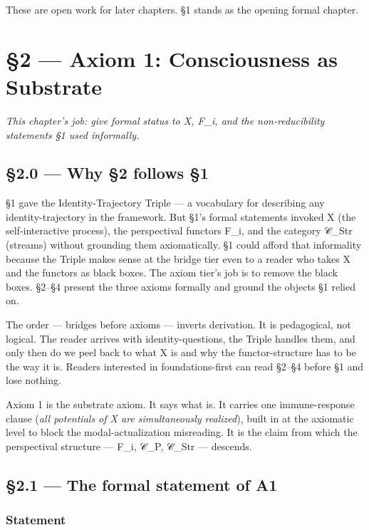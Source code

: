 \documentclass[11pt, openany]{book}
\newcommand{\sectionbreak}{\clearpage}
\begin{document}
These are open work for later chapters. §1 stands as the opening formal chapter.

\chapter{§2 — Axiom 1: Consciousness as Substrate}


\textit{This chapter's job: give formal status to X, F\_\allowbreak{}i, and the non-reducibility statements §1 used informally.}

\sectionbreak

\section{§2.0 --- Why §2 follows §1}

§1 gave the Identity-Trajectory Triple --- a vocabulary for describing any identity-trajectory in the framework. But §1's formal statements invoked X (the self-interactive process), the perspectival functors F\_\allowbreak{}i, and the category 𝒞\_\allowbreak{}Str (streams) without grounding them axiomatically. §1 could afford that informality because the Triple makes sense at the bridge tier even to a reader who takes X and the functors as black boxes. The axiom tier's job is to remove the black boxes. §2–§4 present the three axioms formally and ground the objects §1 relied on.

The order --- bridges before axioms --- inverts derivation. It is pedagogical, not logical. The reader arrives with identity-questions, the Triple handles them, and only then do we peel back to what X is and why the functor-structure has to be the way it is. Readers interested in foundations-first can read §2–§4 before §1 and lose nothing.

Axiom 1 is the substrate axiom. It says what is. It carries one immune-response clause (\textit{all potentials of X are simultaneously realized}), built in at the axiomatic level to block the modal-actualization misreading. It is the claim from which the perspectival structure --- F\_\allowbreak{}i, 𝒞\_\allowbreak{}P, 𝒞\_\allowbreak{}Str --- descends.

\sectionbreak

\section{§2.1 --- The formal statement of A1}

\subsection{Statement}
\end{document}
